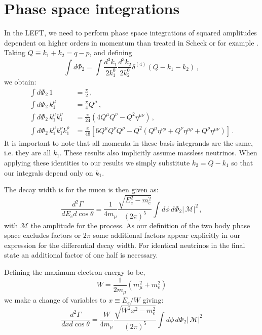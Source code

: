 \section{Phase space integrations}\label{sec:PSintegrals}
In the LEFT, we need to perform phase space integrations of squared amplitudes dependent on higher orders in momentum than treated in Scheck or for example \cite{Marquez:2022bpg}. Taking $Q\equiv k_1+k_2=q-p$, and defining
%
\begin{equation}
\int d\Phi_2=\int \frac{d^3k_1}{2k_1^0}\frac{d^3k_2}{2k_2^0}\delta^{(4)}(Q-k_1-k_2)\, ,
\end{equation}
%
we obtain:
%
\begin{align}
\int d\Phi_2\, 1&=\frac{\pi}{2}\, ,\\
\int d\Phi_2\, k_1^\mu&=\frac{\pi}{4}Q^\mu\, ,\\
\int d\Phi_2\, k_1^\mu k_1^\nu&=\frac{\pi}{24}\left(4Q^\mu Q^\nu-Q^2\eta^{\mu\nu}\right)\, ,\\
\int d\Phi_2\, k_1^\mu k_1^\nu k_1^\rho&=\frac{\pi}{48}\left[6Q^\mu Q^\nu Q^\rho-Q^2\left(Q^\mu \eta^{\nu\rho}+Q^\nu \eta^{\mu\rho}+Q^\rho\eta^{\mu\nu}\right)\right]\, .
\end{align}
%
It is important to note that all momenta in these basis integrands are the same, i.e. they are all $k_1$. These results also implicitly assume massless neutrinos. When applying these identities to our results we simply substitute $k_2=Q-k_1$ so that our integrals depend only on $k_1$. 

The decay width is for the muon is then given as:
%
\begin{equation}
\frac{d^2\Gamma}{dE_e d\cos\theta}=\frac{1}{4m_\mu}\frac{\sqrt{E_e^2-m_e^2}}{(2\pi)^5}\int d\phi\, d\Phi_2|\, \mathcal M|^2\, ,
\end{equation}
%
with $\mathcal M$ the amplitude for the process. As our definition of the two body phase space excludes factors or $2\pi$ some additional factors appear explicitly in our expression for the differential decay width. For identical neutrinos in the final state an additional factor of one half is necessary.

Defining the maximum electron energy to be,
%
\begin{equation}
W = \frac{1}{2m_\mu}(m_\mu^2+m_e^2)
\end{equation}
%
we make a change of variables to $x\equiv E_e/W$ giving:
%
\begin{equation}
\frac{d^2\Gamma}{dx d\cos\theta}=\frac{W}{4m_\mu}\frac{\sqrt{W^2x^2-m_e^2}}{(2\pi)^5}\int d\phi\, d\Phi_2|\, \mathcal M|^2
\end{equation}
%
